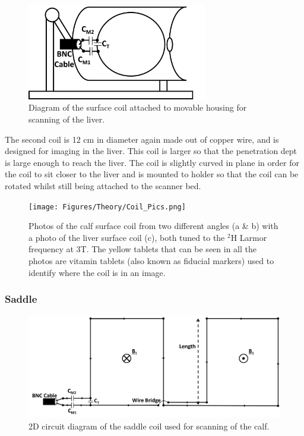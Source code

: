 \documentclass[class=article, crop=false]{standalone}
\begin{document}
\begin{figure}
    \centering
    \includegraphics[width=0.7\textwidth]{Figures/Theory/Liver_Coil.png}
    \caption{Diagram of the surface coil attached to movable housing for scanning of the liver.}
    \label{fig:theory:Liver}
\end{figure}

The second coil is 12 cm in diameter again made out of copper wire, and is designed for imaging in the liver. This coil is larger so that the penetration dept is large enough to reach the liver. The coil is slightly curved in plane in order for the coil to sit closer to the liver and is mounted to holder so that the coil can be rotated whilst still being attached to the scanner bed.

\begin{figure}
    \centering
    \texttt{[image: Figures/Theory/Coil\_Pics.png]}
    \caption{Photos of the calf surface coil from two different angles (a \& b) with a photo of the liver surface coil (c), both tuned to the $^2$H Larmor frequency at 3T. The yellow tablets that can be seen in all the photos are vitamin tablets (also known as fiducial markers) used to identify where the coil is in an image.}
    \label{fig:theory:Pics}
\end{figure}

\subsubsection{Saddle}

\begin{figure}
    \centering
    \includegraphics[width=1\textwidth]{Figures/Theory/Planar_Saddle.png}
    \caption{2D circuit diagram of the saddle coil used for scanning of the calf.}
    \label{fig:theory:2D_Saddle}
\end{figure}
\end{document}
